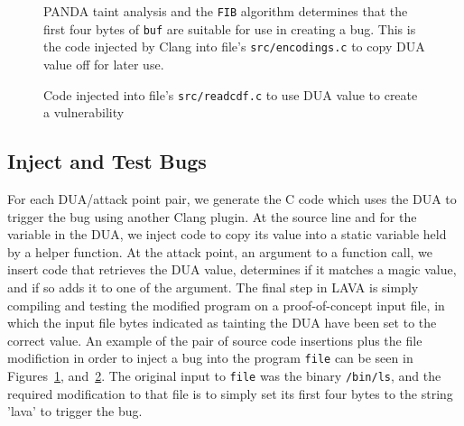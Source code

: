 \begin{figure}

\caption{PANDA taint analysis and the \texttt{FIB} algorithm determines that the first four bytes of \texttt{buf} are suitable for use in creating a bug.
This is the code injected by Clang into file's \texttt{src/encodings.c} to copy DUA value off for later use.}
\label{src:dua-siphon}
\end{figure}

\begin{figure}

\caption{Code injected into file's \texttt{src/readcdf.c} to use DUA value to create a vulnerability}
\label{src:dua-use}
\end{figure}

\subsection{Inject and Test Bugs}
For each DUA/attack point pair, we generate the C code which uses the DUA to trigger the bug using another Clang plugin.
At the source line and for the variable in the DUA, we inject code to copy its value into a static variable held by a helper function.
At the attack point, an argument to a function call, we insert code that retrieves the DUA value, determines if it matches a magic value, and if so adds it to one of the argument.
The final step in LAVA is simply compiling and testing the modified program on a proof-of-concept input file, in which the input file bytes indicated as tainting the DUA have been set to the correct value.
An example of the pair of source code insertions plus the file modifiction in order to inject a bug into the program \verb+file+ can be seen in Figures~\ref{src:dua-siphon}, and~\ref{src:dua-use}.
The original input to \verb+file+ was the binary \verb+/bin/ls+, and the required modification to that file is to simply set its first four bytes to the string 'lava' to trigger the bug. 

